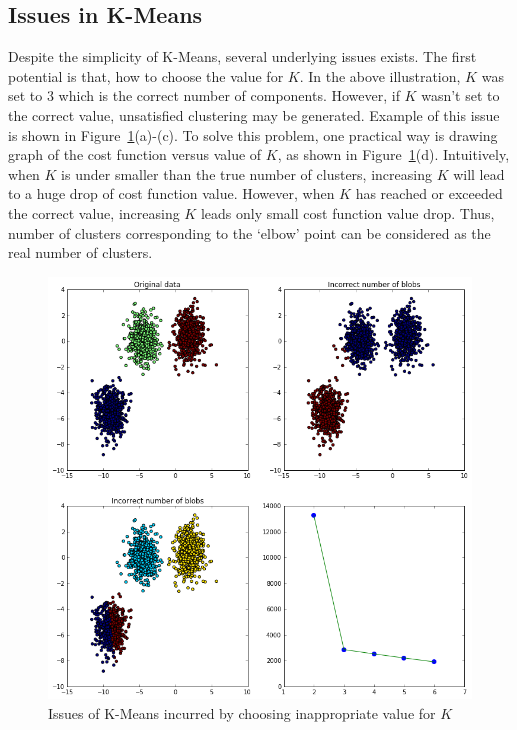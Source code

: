 \subsection{Issues in K-Means}
\label{subsec:KMeansIssues}
Despite the simplicity of K-Means, several underlying issues exists. The first potential is that, how to choose the value for \(K\). In the above illustration, \(K\) was set to 3 which is the correct number of components. However, if \(K\) wasn't set to the correct value, unsatisfied clustering may be generated. Example of this issue is shown in Figure~\ref{fig:KMeansIssue}(a)-(c). To solve this problem, one practical way is drawing graph of the cost function versus value of \(K\), as shown in Figure~\ref{fig:KMeansIssue}(d). Intuitively, when \(K\) is under smaller than the true number of clusters, increasing \(K\) will lead to a huge drop of cost function value. However, when \(K\) has reached or exceeded the correct value, increasing \(K\) leads only small cost function value drop. Thus, number of clusters corresponding to the `elbow' point can be considered as the real number of clusters.

\begin{figure}
	\begin{center}
		\includegraphics[width=\textwidth]{images/KMeansIncorrectNumber.png}
		\caption{Issues of K-Means incurred by choosing inappropriate value for \(K\)}
		\label{fig:KMeansIssue}
	\end{center}
\end{figure}

